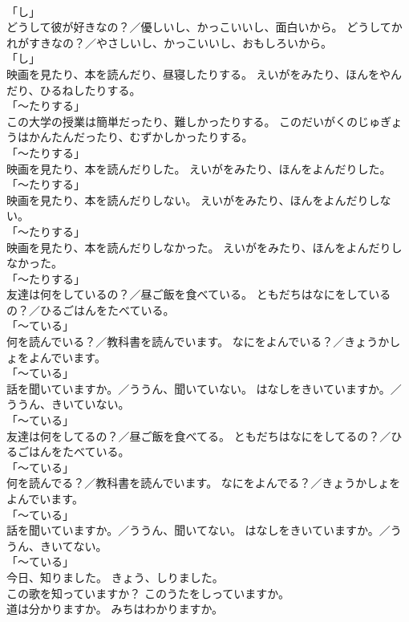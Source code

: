 \documentclass[8pt]{extreport}
\begin{document}
\begin{CJK}{UTF8}{min}
\\	「し」	
\\	どうして彼が好きなの？／優しいし、かっこいいし、面白いから。	どうしてかれがすきなの？／やさしいし、かっこいいし、おもしろいから。	
\\	「し」	
\\	映画を見たり、本を読んだり、昼寝したりする。	えいがをみたり、ほんをやんだり、ひるねしたりする。	
\\	「～たりする」	
\\	この大学の授業は簡単だったり、難しかったりする。	このだいがくのじゅぎょうはかんたんだったり、むずかしかったりする。	
\\	「～たりする」	
\\	映画を見たり、本を読んだりした。	えいがをみたり、ほんをよんだりした。	
\\	「～たりする」	
\\	映画を見たり、本を読んだりしない。	えいがをみたり、ほんをよんだりしない。	
\\	「～たりする」	
\\	映画を見たり、本を読んだりしなかった。	えいがをみたり、ほんをよんだりしなかった。	
\\	「～たりする」	
\\	友達は何をしているの？／昼ご飯を食べている。	ともだちはなにをしているの？／ひるごはんをたべている。	
\\	「～ている」 
\\	何を読んでいる？／教科書を読んでいます。	なにをよんでいる？／きょうかしょをよんでいます。	
\\	「～ている」 
\\	話を聞いていますか。／ううん、聞いていない。	はなしをきいていますか。／ううん、きいていない。	
\\	「～ている」 
\\	友達は何をしてるの？／昼ご飯を食べてる。	ともだちはなにをしてるの？／ひるごはんをたべている。	
\\	「～ている」 
\\	何を読んでる？／教科書を読んでいます。	なにをよんでる？／きょうかしょをよんでいます。	
\\	「～ている」 
\\	話を聞いていますか。／ううん、聞いてない。	はなしをきいていますか。／ううん、きいてない。	
\\	「～ている」 
\\	今日、知りました。	きょう、しりました。	
\\	この歌を知っていますか？	このうたをしっていますか。	
\\	道は分かりますか。	みちはわかりますか。	

\end{CJK}
\end{document}
